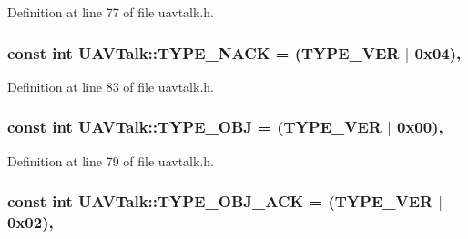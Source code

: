 Definition at line 77 of file uavtalk.\-h.

\hypertarget{group___u_a_v_talk_plugin_ga809ec3528886e43e38072e2d16787668}{
\subsubsection[{T\-Y\-P\-E\-\_\-\-N\-A\-C\-K}]{\setlength{\rightskip}{0pt plus 5cm}const {\bf int} U\-A\-V\-Talk\-::\-T\-Y\-P\-E\-\_\-\-N\-A\-C\-K = (T\-Y\-P\-E\-\_\-\-V\-E\-R $|$ 0x04)\hspace{0.3cm}{\ttfamily [static]}, {\ttfamily [protected]}}}\label{group___u_a_v_talk_plugin_ga809ec3528886e43e38072e2d16787668}


Definition at line 83 of file uavtalk.\-h.

\hypertarget{group___u_a_v_talk_plugin_ga160fa827bdb9b5114b132cf644f76d4c}{
\subsubsection[{T\-Y\-P\-E\-\_\-\-O\-B\-J}]{\setlength{\rightskip}{0pt plus 5cm}const {\bf int} U\-A\-V\-Talk\-::\-T\-Y\-P\-E\-\_\-\-O\-B\-J = (T\-Y\-P\-E\-\_\-\-V\-E\-R $|$ 0x00)\hspace{0.3cm}{\ttfamily [static]}, {\ttfamily [protected]}}}\label{group___u_a_v_talk_plugin_ga160fa827bdb9b5114b132cf644f76d4c}


Definition at line 79 of file uavtalk.\-h.

\hypertarget{group___u_a_v_talk_plugin_gafc2b2ad8c68063a80d64666d0e812572}{
\subsubsection[{T\-Y\-P\-E\-\_\-\-O\-B\-J\-\_\-\-A\-C\-K}]{\setlength{\rightskip}{0pt plus 5cm}const {\bf int} U\-A\-V\-Talk\-::\-T\-Y\-P\-E\-\_\-\-O\-B\-J\-\_\-\-A\-C\-K = (T\-Y\-P\-E\-\_\-\-V\-E\-R $|$ 0x02)\hspace{0.3cm}{\ttfamily [static]}, {\ttfamily [protected]}}}\label{group___u_a_v_talk_plugin_gafc2b2ad8c68063a80d64666d0e812572}


